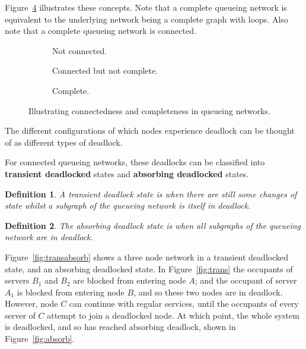 \documentclass{article}
\newtheorem{definition}{Definition}
\begin{document}
Figure~\ref{fig:connectedcomplete} illustrates these concepts.
Note that a complete queueing network is equivalent to the underlying network being a complete graph with loops.
Also note that a complete queueing network is connected.

\begin{figure}[!htbp]
\begin{center}
\begin{subfigure}[b]{0.3\textwidth}
  
  \caption{Not connected.}
  \label{fig:connected}
\end{subfigure}
\begin{subfigure}[b]{0.3\textwidth}
  
  \caption{Connected but not complete.}
  \label{fig:notconnected}
\end{subfigure}
\begin{subfigure}[b]{0.3\textwidth}
  
  \caption{Complete.}
  \label{fig:complete}
\end{subfigure}
\end{center}
\caption{Illustrating connectedness and completeness in queueing networks.}
\label{fig:connectedcomplete}
\end{figure}

The different configurations of which nodes experience deadlock can be thought
of as different types of deadlock.

For connected queueing networks, these deadlocks can be classified into \textbf{transient deadlocked} states and \textbf{absorbing deadlocked} states.\\


\begin{definition}
    A transient deadlock state is when there are still some changes of state
    whilst a subgraph of the queueing network is itself in deadlock.\\
\end{definition}

\begin{definition}
    The absorbing deadlock state is when all subgraphs of the
    queueing network are in deadlock.\\
\end{definition}

Figure~\ref{fig:transabsorb} shows a three node network in a transient deadlocked state, and an absorbing deadlocked state.
In Figure~\ref{fig:trans} the occupants of servers $B_1$ and $B_2$ are blocked from entering node $A$; and the occupant of server $A_1$ is blocked from entering node $B$, and so these two nodes are in deadlock.
However, node $C$ can continue with regular services, until the occupants of every server of $C$ attempt to join a deadlocked node.
At which point, the whole system is deadlocked, and so has reached absorbing deadlock, shown in Figure~\ref{fig:absorb}.
\end{document}
